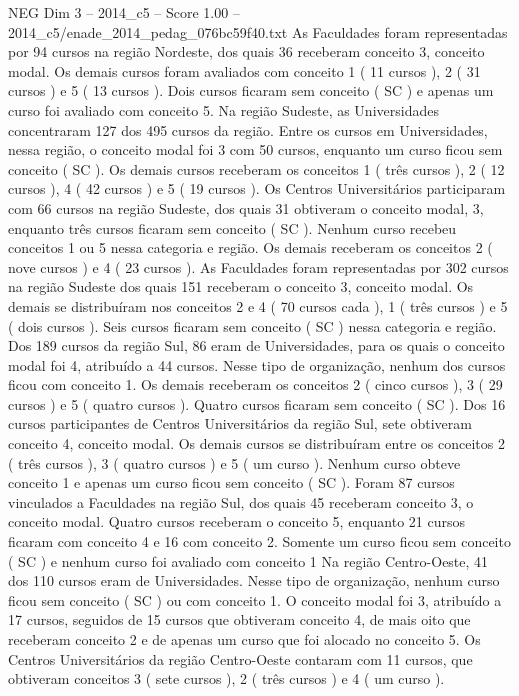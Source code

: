\begin{textsample}{NEG Dim 3 – 2014\_c5 – Score 1.00 – 2014\_c5/enade\_2014\_pedag\_076bc59f40.txt}
As Faculdades foram representadas por 94 cursos na região Nordeste, dos quais 36 receberam conceito 3, conceito modal.
Os demais cursos foram avaliados com conceito 1 ( 11 cursos ), 2 ( 31 cursos ) e 5 ( 13 cursos ).
Dois cursos ficaram sem conceito ( SC ) e apenas um curso foi avaliado com conceito 5.
Na região Sudeste, as Universidades concentraram 127 dos 495 cursos da região.
Entre os cursos em Universidades, nessa região, o conceito modal foi 3 com 50 cursos, enquanto um curso ficou sem conceito ( SC ).
Os demais cursos receberam os conceitos 1 ( três cursos ), 2 ( 12 cursos ), 4 ( 42 cursos ) e 5 ( 19 cursos ).
Os Centros Universitários participaram com 66 cursos na região Sudeste, dos quais 31 obtiveram o conceito modal, 3, enquanto três cursos ficaram sem conceito ( SC ).
Nenhum curso recebeu conceitos 1 ou 5 nessa categoria e região.
Os demais receberam os conceitos 2 ( nove cursos ) e 4 ( 23 cursos ).
As Faculdades foram representadas por 302 cursos na região Sudeste dos quais 151 receberam o conceito 3, conceito modal.
Os demais se distribuíram nos conceitos 2 e 4 ( 70 cursos cada ), 1 ( três cursos ) e 5 ( dois cursos ).
Seis cursos ficaram sem conceito ( SC ) nessa categoria e região.
Dos 189 cursos da região Sul, 86 eram de Universidades, para os quais o conceito modal foi 4, atribuído a 44 cursos.
Nesse tipo de organização, nenhum dos cursos ficou com conceito 1.
Os demais receberam os conceitos 2 ( cinco cursos ), 3 ( 29 cursos ) e 5 ( quatro cursos ).
Quatro cursos ficaram sem conceito ( SC ).
Dos 16 cursos participantes de Centros Universitários da região Sul, sete obtiveram conceito 4, conceito modal.
Os demais cursos se distribuíram entre os conceitos 2 ( três cursos ), 3 ( quatro cursos ) e 5 ( um curso ).
Nenhum curso obteve conceito 1 e apenas um curso ficou sem conceito ( SC ).
Foram 87 cursos vinculados a Faculdades na região Sul, dos quais 45 receberam conceito 3, o conceito modal.
Quatro cursos receberam o conceito 5, enquanto 21 cursos ficaram com conceito 4 e 16 com conceito 2.
Somente um curso ficou sem conceito ( SC ) e nenhum curso foi avaliado com conceito 1 Na região Centro-Oeste, 41 dos 110 cursos eram de Universidades.
Nesse tipo de organização, nenhum curso ficou sem conceito ( SC ) ou com conceito 1.
O conceito modal foi 3, atribuído a 17 cursos, seguidos de 15 cursos que obtiveram conceito 4, de mais oito que receberam conceito 2 e de apenas um curso que foi alocado no conceito 5.
Os Centros Universitários da região Centro-Oeste contaram com 11 cursos, que obtiveram conceitos 3 ( sete cursos ), 2 ( três cursos ) e 4 ( um curso ).

\end{textsample}
